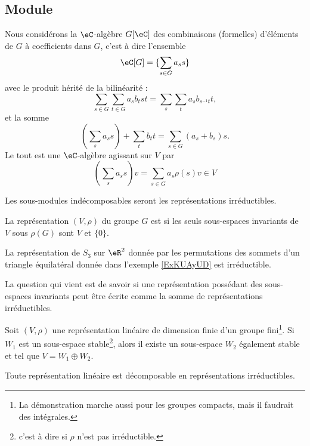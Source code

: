 \subsection{Module}

Nous considérons la \( \eC\)-algèbre \( G[\eC]\) des combinaisons (formelles) d'éléments de \( G\) à coefficients dans \( G\), c'est à dire l'ensemble
\begin{equation}
    \eC[G]=\{ \sum_{s\in G}a_ss \}
\end{equation}
avec le produit hérité de la bilinéarité :
\begin{equation}
    \sum_{s\in G}\sum_{t\in G}a_sb_tst=\sum_s\sum_t a_sb_{s^{-1}t}t,
\end{equation}
et la somme
\begin{equation}
    (\sum_sa_ss)+\sum_tb_tt=\sum_{s\in G}(a_s+b_s)s.
\end{equation}
Le tout est une \( \eC\)-algèbre agissant sur \( V\) par
\begin{equation}
    \left( \sum_sa_ss \right)v=\sum_{s\in G}a_s\rho(s)v\in V
\end{equation}

Les sous-modules indécomposables seront les représentations irréductibles.

\begin{definition}
    La représentation \( (V,\rho)\) du groupe \( G\) est  si les seuls sous-espaces invariants de \( V\) sous \( \rho(G)\) sont $V$ et \( \{ 0 \}\).
\end{definition}

\begin{example}
    La représentation de \( S_3\) sur \( \eR^2\) donnée par les permutations des sommets d'un triangle équilatéral donnée dans l'exemple \ref{ExKUAyUD} est irréductible.
\end{example}

La question qui vient est de savoir si une représentation possédant des sous-espaces invariants peut être écrite comme la somme de représentations irréductibles.

\begin{proposition} \label{PropHeyoAN}  
    Soit \( (V,\rho)\) une représentation linéaire de dimension finie d'un groupe fini\footnote{La démonstration marche aussi pour les groupes compacts, mais il faudrait des intégrales.}. Si \( W_1\) est un sous-espace stable\footnote{c'est à dire si \( \rho\) n'est pas irréductible.}, alors il existe un sous-espace \( W_2\) également stable et tel que \( V=W_1\oplus W_2\).

    Toute représentation linéaire est décomposable en représentations irréductibles.
\end{proposition}

